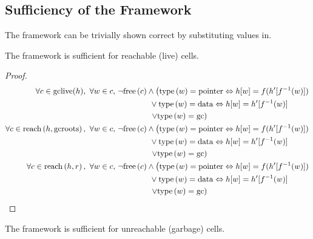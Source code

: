 \subsection{Sufficiency of the Framework}
\label{sec:gc-framework-sufficiency}

The framework can be trivially shown correct by substituting values
in.

\begin{lemma}
  The framework is sufficient for reachable (live) cells.
\end{lemma}

\begin{proof}
  \begin{align*}
    \forall c \in \mathrm{gclive}(h),\ \forall w \in c,\ & \lnot\free{c}
      \land \left(\type{w} = \typointer \iff h[w] =
      f(h'[f^{-1}(w)])\right.\\
    &\quad\quad\quad\quad \lor \type{w} = \tydata
    \iff h[w] = h'[f^{-1}(w)]\\
    &\quad\quad\quad\quad \left.\lor \type{w} =
      \tygc\right)\\
%
    \forall c \in \reach{h}{\mathrm{gcroots}},\ \forall w \in c,\ &
      \lnot\free{c} \land \left(\type{w} = \typointer \iff
      h[w] = f(h'[f^{-1}(w)])\right.\\
    &\quad\quad\quad\quad \lor \type{w} = \tydata
      \iff h[w] = h'[f^{-1}(w)]\\
    &\quad\quad\quad\quad \left.\lor \type{w} =
      \tygc\right)\\
%
    \forall c \in \reach{h}{r},\ \forall w \in c,\ & \lnot\free{c} \land
      \left(\type{w} = \typointer \iff
      h[w] = f(h'[f^{-1}(w)])\right.\\
    &\quad\quad\quad\quad \lor \type{w} = \tydata
      \iff h[w] = h'[f^{-1}(w)]\\
    &\quad\quad\quad\quad \left.\lor \type{w} =
      \tygc\right)
\end{align*}
\end{proof}

\begin{lemma}
  The framework is sufficient for unreachable (garbage) cells.
\end{lemma}

